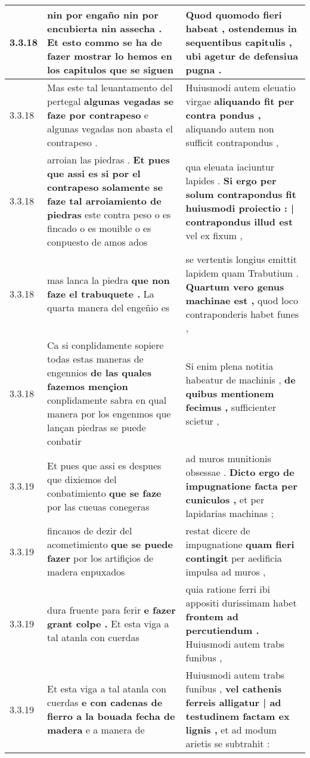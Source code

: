 \begin{tabular}{|p{1cm}|p{6.5cm}|p{6.5cm}|}
3.3.18 & nin por engaño \textbf{ nin por encubierta nin assecha . Et esto commo se ha de fazer mostrar lo hemos en los capitulos } que se siguen & Quod quomodo fieri habeat , \textbf{ ostendemus in sequentibus capitulis , } ubi agetur de defensiua pugna . \\\hline
3.3.18 & Mas este tal leuantamento del pertegal \textbf{ algunas vegadas se faze por contrapeso } e algunas vegadas non abasta el contrapeso . & Huiusmodi autem eleuatio virgae \textbf{ aliquando fit per contra pondus , } aliquando autem non sufficit contrapondus , \\\hline
3.3.18 & arroian las piedras . \textbf{ Et pues que assi es si por el contrapeso solamente se faze tal arroiamiento de piedras } este contra peso o es fincado o es mouible o es conpuesto de amos ados & qua eleuata iaciuntur lapides . \textbf{ Si ergo per solum contrapondus fit huiusmodi proiectio : | contrapondus illud est } vel ex fixum , \\\hline
3.3.18 & mas lanca la piedra \textbf{ que non faze el trabuquete . } La quarta manera del engeñio es & se vertentis longius emittit lapidem quam Trabutium . \textbf{ Quartum vero genus machinae est , } quod loco contraponderis habet funes , \\\hline
3.3.18 & Ca si conplidamente sopiere todas estas maneras de engennios \textbf{ de las quales fazemos mençion } conplidamente sabra en qual manera por los engenmos que lançan piedras se puede conbatir & Si enim plena notitia habeatur de machinis , \textbf{ de quibus mentionem fecimus , } sufficienter scietur , \\\hline
3.3.19 & Et pues que assi es despues que dixiemos del conbatimiento \textbf{ que se faze } por las cueuas conegeras & ad muros munitionis obsessae . \textbf{ Dicto ergo de impugnatione facta per cuniculos , } et per lapidarias machinas ; \\\hline
3.3.19 & fincanos de dezir del acometimiento \textbf{ que se puede fazer } por los artifiçios de madera enpuxados & restat dicere de impugnatione \textbf{ quam fieri contingit } per aedificia impulsa ad muros , \\\hline
3.3.19 & dura fruente para ferir \textbf{ e fazer grant colpe . } Et esta viga a tal atanla con cuerdas & quia ratione ferri ibi appositi durissimam habet \textbf{ frontem ad percutiendum . } Huiusmodi autem trabs funibus , \\\hline
3.3.19 & Et esta viga a tal atanla con cuerdas \textbf{ e con cadenas de fierro a la bouada fecha de madera } e a manera de & Huiusmodi autem trabs funibus , \textbf{ vel cathenis ferreis alligatur | ad testudinem factam ex lignis , } et ad modum arietis se subtrahit : \\\hline

\end{tabular}

